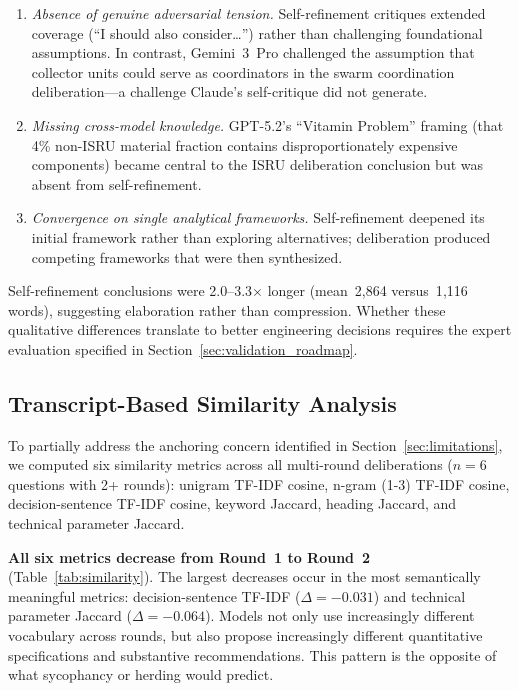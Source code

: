 \documentclass[11pt,a4paper]{article}
\begin{document}
\begin{enumerate}[nosep]
    \item \emph{Absence of genuine adversarial tension.} Self-refinement critiques extended coverage (``I should also consider\ldots'') rather than challenging foundational assumptions. In contrast, Gemini~3~Pro challenged the assumption that collector units could serve as coordinators in the swarm coordination deliberation---a challenge Claude's self-critique did not generate.
    \item \emph{Missing cross-model knowledge.} GPT-5.2's ``Vitamin Problem'' framing (that 4\% non-ISRU material fraction contains disproportionately expensive components) became central to the ISRU deliberation conclusion but was absent from self-refinement.
    \item \emph{Convergence on single analytical frameworks.} Self-refinement deepened its initial framework rather than exploring alternatives; deliberation produced competing frameworks that were then synthesized.
\end{enumerate}

Self-refinement conclusions were 2.0--3.3$\times$ longer (mean~2{,}864 versus~1{,}116 words), suggesting elaboration rather than compression. Whether these qualitative differences translate to better engineering decisions requires the expert evaluation specified in Section~\ref{sec:validation_roadmap}.

\subsection{Transcript-Based Similarity Analysis}
\label{sec:similarity}

To partially address the anchoring concern identified in Section~\ref{sec:limitations}, we computed six similarity metrics across all multi-round deliberations ($n = 6$ questions with 2+ rounds): unigram TF-IDF cosine, n-gram (1-3) TF-IDF cosine, decision-sentence TF-IDF cosine, keyword Jaccard, heading Jaccard, and technical parameter Jaccard.

\textbf{All six metrics decrease from Round~1 to Round~2} (Table~\ref{tab:similarity}). The largest decreases occur in the most semantically meaningful metrics: decision-sentence TF-IDF ($\Delta = -0.031$) and technical parameter Jaccard ($\Delta = -0.064$). Models not only use increasingly different vocabulary across rounds, but also propose increasingly different quantitative specifications and substantive recommendations. This pattern is the opposite of what sycophancy or herding would predict.
\end{document}
